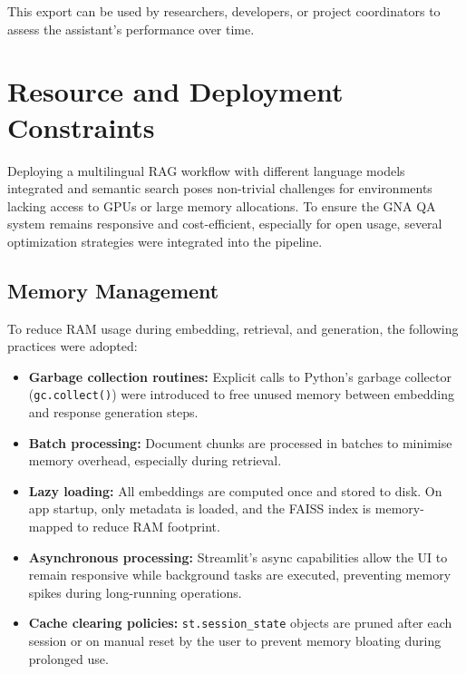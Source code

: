 \begin{spacing}{1.5}
This export can be used by researchers, developers, or project coordinators to assess the assistant's performance over time.


\section{Resource and Deployment Constraints}
Deploying a multilingual RAG workflow with different language models integrated and semantic search poses non-trivial challenges for environments lacking access to GPUs or large memory allocations. To ensure the GNA QA system remains responsive and cost-efficient, especially for open usage, several optimization strategies were integrated into the pipeline.

\subsection{Memory Management}
To reduce RAM usage during embedding, retrieval, and generation, the following practices were adopted:
\begin{itemize}
\item \textbf{Garbage collection routines:} Explicit calls to Python's garbage collector (\texttt{gc.collect()}) were introduced to free unused memory between embedding and response generation steps.
\item \textbf{Batch processing:} Document chunks are processed in batches to minimise memory overhead, especially during retrieval.
\item \textbf{Lazy loading:} All embeddings are computed once and stored to disk. On app startup, only metadata is loaded, and the FAISS index is memory-mapped to reduce RAM footprint.
\item \textbf{Asynchronous processing:} Streamlit's async capabilities allow the UI to remain responsive while background tasks are executed, preventing memory spikes during long-running operations.
\item \textbf{Cache clearing policies:} \texttt{st.session\_state} objects are pruned after each session or on manual reset by the user to prevent memory bloating during prolonged use.
\end{itemize}


\end{spacing}
